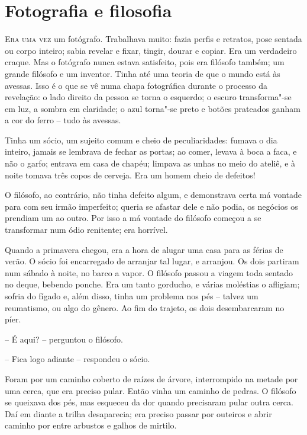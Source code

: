 \chapter{Fotografia e filosofia}


\textsc{Era uma vez} um fotógrafo. Trabalhava muito: fazia perfis e retratos,
pose sentada ou corpo inteiro; sabia revelar e fixar, tingir, dourar e
copiar. Era um verdadeiro craque. Mas o fotógrafo nunca estava
satisfeito, pois era filósofo também; um grande filósofo e um inventor.
Tinha até uma teoria de que o mundo está às avessas. Isso é o que se vê
numa chapa fotográfica durante o processo da revelação: o lado direito
da pessoa se torna o esquerdo; o escuro transforma"-se em luz, a
sombra em claridade; o azul torna"-se preto e botões prateados ganham
a cor do ferro -- tudo às avessas. 

Tinha um sócio, um sujeito comum e cheio de peculiaridades: fumava o dia
inteiro, jamais se lembrava de fechar as portas; ao comer, levava à
boca a faca, e não o garfo; entrava em casa de chapéu; limpava as unhas
no meio do ateliê, e à noite tomava três copos de cerveja. Era um homem
cheio de defeitos!

O filósofo, ao contrário, não tinha defeito algum, e demonstrava certa
má vontade para com seu irmão imperfeito; queria se afastar dele e não
podia, os negócios os prendiam um ao outro. Por isso a má vontade do
filósofo começou a se transformar num ódio renitente; era horrível.

Quando a primavera chegou, era a hora de alugar uma casa para as férias
de verão. O sócio foi encarregado de arranjar tal lugar, e arranjou. Os
dois partiram num \mbox{sábado} à noite, no barco a vapor. O filósofo passou a
viagem toda sentado no deque, bebendo ponche. Era um tanto gorducho, e
várias moléstias o afligiam; sofria do fígado e, além disso, tinha um
problema nos pés -- talvez um reumatismo, ou algo do gênero. Ao fim do
trajeto, os dois desembarcaram no píer. 

-- É aqui? -- perguntou o filósofo.

-- Fica logo adiante -- respondeu o sócio.

Foram por um caminho coberto de raízes de árvore, interrompido na metade
por uma cerca, que era preciso pular. Então vinha um caminho de pedras.
O filósofo se queixava dos pés, mas esqueceu da dor quando precisaram
pular outra cerca. Daí em diante a trilha desaparecia; era preciso
passar por outeiros e abrir caminho por entre arbustos e galhos de
mirtilo.

